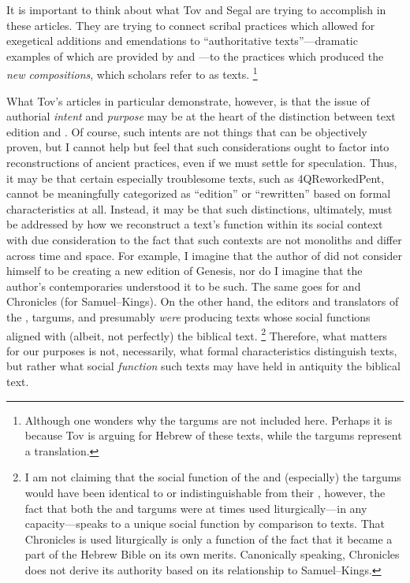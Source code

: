 It is important to think about what Tov and Segal are trying to accomplish in these articles. They are trying to connect scribal practices which allowed for exegetical additions and emendations to ``authoritative texts''---dramatic examples of which are provided by \sampent and \lxx---to the practices which produced the \emph{new compositions}, which scholars refer to as \rwb texts.%
    \footnote{%
        Although one wonders why the targums are not included here. Perhaps it is because Tov is arguing for Hebrew \vorlagen of these texts, while the targums represent a translation.}

What Tov's articles in particular demonstrate, however, is that the issue of authorial \emph{intent} and \emph{purpose} may be at the heart of the distinction between text edition and \rwb. Of course, such intents are not things that can be objectively proven, but I cannot help but feel that such considerations ought to factor into reconstructions of ancient practices, even if we must settle for speculation. Thus, it may be that certain especially troublesome texts, such as 4QReworkedPent, cannot be meaningfully categorized as ``edition'' or ``rewritten'' based on formal characteristics at all. Instead, it may be that such distinctions, ultimately, must be addressed by how we reconstruct a text's function within its social context with due consideration to the fact that such contexts are not monoliths and differ across time and space. For example, I imagine that the author of \ga did not consider himself to be creating a new edition of Genesis, nor do I imagine that the author's contemporaries understood it to be such. The same goes for \jub and Chronicles (for Samuel--Kings). On the other hand, the editors and translators of the \sampent, targums, and \lxx presumably \emph{were} producing texts whose social functions aligned with (albeit, not perfectly) the biblical text.%
    \footnote{%
        I am not claiming that the social function of the \lxx and (especially) the targums would have been identical to or indistinguishable from their \vorlagen, however, the fact that both the \lxx and targums were at times used liturgically---in any capacity---speaks to a unique social function by comparison to \rwb texts. That Chronicles is used liturgically is only a function of the fact that it became a part of the Hebrew Bible on its own merits. Canonically speaking, Chronicles does not derive its authority based on its relationship to Samuel--Kings.}
%
Therefore, what matters for our purposes is not, necessarily, what formal characteristics distinguish \rwb texts, but rather what social \emph{function} such texts may have held in antiquity \visavis the biblical text.


